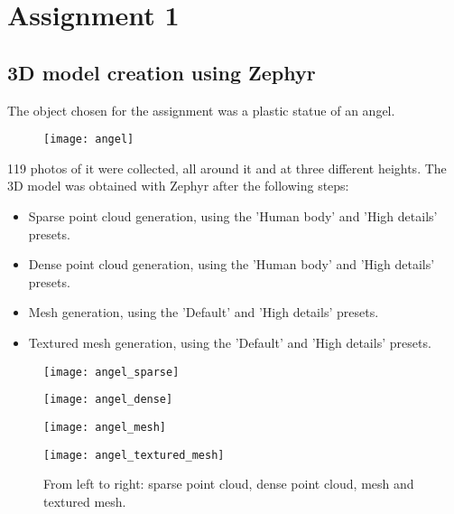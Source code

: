 \section{Assignment 1}

\subsection{3D model creation using Zephyr}

The object chosen for the assignment was a plastic statue of an angel.

\begin{figure}[h]
\centering
\texttt{[image: angel]}
\end{figure}

119 photos of it were collected, all around it and at three different heights. The 3D model was obtained with Zephyr after the following steps:
\begin{itemize}
\item Sparse point cloud generation, using the 'Human body' and 'High details' presets.
\item Dense point cloud generation, using the 'Human body' and 'High details' presets.
\item Mesh generation, using the 'Default' and 'High details' presets.
\item Textured mesh generation, using the 'Default' and 'High details' presets.
\end{itemize}

\begin{figure}[H]
\centering
\begin{minipage}{0.23\textwidth}
\texttt{[image: angel\_sparse]}
\end{minipage}
\begin{minipage}{0.25\textwidth}
\texttt{[image: angel\_dense]}
\end{minipage}
\begin{minipage}{0.25\textwidth}
\texttt{[image: angel\_mesh]}
\end{minipage}
\begin{minipage}{0.25\textwidth}
\texttt{[image: angel\_textured\_mesh]}
\end{minipage}
\caption{From left to right: sparse point cloud, dense point cloud, mesh and textured mesh.}
\end{figure}